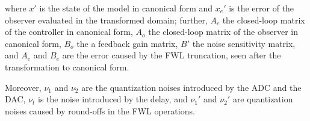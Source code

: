 \documentclass[a4paper,UKenglish]{lipics-v2018}
\newcommand{\mat}[1]{{#1}}
\renewcommand{\vec}[1]{{#1}}
\begin{document}
%
where $\vec{x}'$ is the state of the model in canonical form and
$\vec{x}_e'$ is the error of the observer evaluated in the transformed
domain; further, $\mat{A}_{c}$ the closed-loop matrix of the controller in
canonical form, $\mat{A}_{o}$ the closed-loop matrix of the observer in
canonical form, $\mat{B}_{o}$ the a feedback gain matrix, $\mat{B}'$ the
noise sensitivity matrix, and $\mat{A}_{e}$ and $\mat{B}_{e}$ are the error
caused by the FWL truncation, seen after the transformation to canonical
form.

%
Moreover, $\nu_1$ and $\nu_2$ are the quantization noises introduced by the
ADC and the DAC, $\nu_t$ is the noise introduced by the delay, and $\nu_1'$
and $\nu_2'$ are quantization noises caused by round-offs in the FWL
operations.
\end{document}

